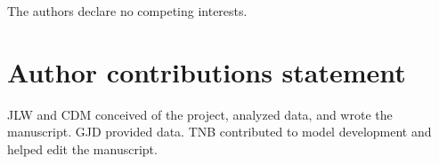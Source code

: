 \documentclass[webpdf,large,modern,unnumsec,namedate]{oup-authoring-template}
\begin{document}
The authors declare no competing interests.

\section{Author contributions statement}

JLW and CDM conceived of the project, analyzed data, and wrote the
manuscript. GJD provided data. TNB contributed to model development and
helped edit the manuscript.


\renewcommand\refname{References}




\end{document}
